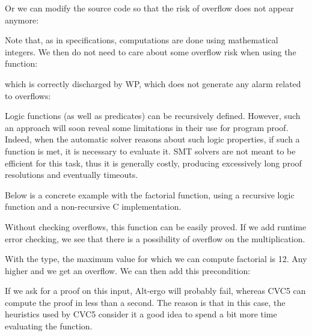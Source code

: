 

Or we can modify the source code so that the risk of overflow does not
appear anymore:




Note that, as in specifications, computations are done using mathematical
integers. We then do not need to care about some overflow risk when using
the  function:




which is correctly discharged by WP, which does not generate any alarm
related to overflows:






Logic functions (as well as predicates) can be recursively defined.
However, such an approach will soon reveal some limitations in their use for
program proof. Indeed, when the automatic solver reasons about such logic
properties, if such a function is met, it is necessary to evaluate it.
SMT solvers are not meant to be efficient for this task, thus it is generally
costly, producing excessively long proof resolutions and eventually timeouts.

Below is a concrete example with the factorial function, using a
recursive logic function and a non-recursive C implementation.






Without checking overflows, this function can be easily proved. If
we add runtime error checking, we see that there is a possibility of
overflow on the multiplication.



With the  type, the maximum value for which we can compute
factorial is 12. Any higher and we get an overflow. We can then add this
precondition:






If we ask for a proof on this input, Alt-ergo will probably fail,
whereas CVC5 can compute the proof in less than a second. The reason is
that in this case, the heuristics used by CVC5 consider it
a good idea to spend a bit more time evaluating the
function.



